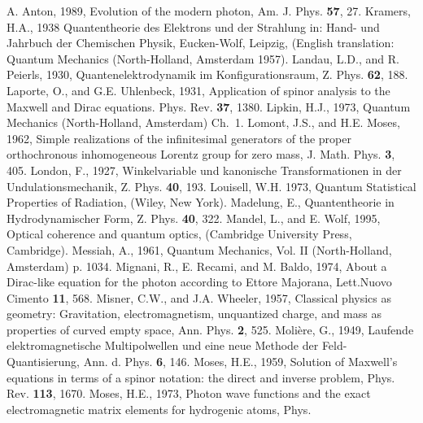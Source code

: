 \documentclass[11pt]{article}
\begin{document}
\begin{thebibliography}{References}
A. Anton, 1989, Evolution of the modern photon, Am. J. Phys. {\bf 57}, 27.
 Kramers, H.A., 1938 Quantentheorie
des Elektrons und der Strahlung in: Hand- und Jahrbuch der Chemischen
Physik, Eucken-Wolf, Leipzig, (English translation: Quantum Mechanics
(North-Holland, Amsterdam 1957).
 Landau, L.D., and R. Peierls,
1930, Quantenelektrodynamik im Konfigurationsraum, Z. Phys. {\bf 62}, 188.
 Laporte, O., and G.E.
Uhlenbeck, 1931, Application of spinor analysis to the Maxwell and Dirac
equations. Phys. Rev. {\bf 37}, 1380.
 Lipkin, H.J., 1973, Quantum Mechanics
(North-Holland, Amsterdam) Ch.~1.
 Lomont, J.S., and H.E. Moses,
1962, Simple realizations of the infinitesimal generators of the proper
orthochronous inhomogeneous Lorentz group for zero mass, J. Math. Phys. {\bf
3}, 405.
 London, F., 1927, Winkelvariable und
kanonische Transformationen in der Undulationsmechanik, Z. Phys. {\bf 40},
193.
 Louisell, W.H. 1973, Quantum
Statistical Properties of Radiation, (Wiley, New York).
 Madelung, E., Quantentheorie in
Hydrodynamischer Form, Z. Phys. {\bf 40}, 322.
 Mandel, L., and E. Wolf, 1995,
Optical coherence and quantum optics, (Cambridge University Press,
Cambridge).
 Messiah, A., 1961, Quantum Mechanics,
Vol. II (North-Holland, Amsterdam) p. 1034.
 Mignani, R., E.
Recami, and M. Baldo, 1974, About a Dirac-like equation for the photon according to Ettore Majorana, Lett.Nuovo Cimento {\bf 11}, 568.
 Misner, C.W., and J.A. Wheeler,
1957, Classical physics as geometry: Gravitation, electromagnetism,
unquantized charge, and mass as properties of curved empty space, Ann. Phys.
{\bf 2}, 525.
 Moli\`ere, G., 1949, Laufende
elektromagnetische Multipolwellen und eine neue Methode der
Feld-Quantisierung, Ann. d. Phys. {\bf 6}, 146.
 Moses, H.E., 1959, Solution of Maxwell's
equations in terms of a spinor notation: the direct and inverse problem,
Phys. Rev. {\bf 113}, 1670.
 Moses, H.E., 1973, Photon wave functions
and the exact electromagnetic matrix elements for hydrogenic atoms, Phys.

\end{thebibliography}
\end{document}
